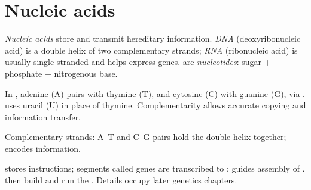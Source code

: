\section{Nucleic acids}

\begin{definition}\label{def:g10:molecules-of-life:nucleic}
\emph{Nucleic acids} store and transmit hereditary
information. \emph{DNA} (deoxyribonucleic acid) is a double
helix of two complementary strands; \emph{RNA} (ribonucleic
acid) is usually single-stranded and helps express genes.  are
\emph{nucleotides}: sugar + phosphate + nitrogenous
base.
\end{definition}

\begin{definition}\label{def:g10:molecules-of-life:base-pair}
In , adenine (A) pairs with thymine (T), and cytosine (C) with
guanine (G), via .  uses uracil (U) in place of thymine.
Complementarity allows accurate copying and information transfer.
\end{definition}

\begin{omfigure}

{\small Complementary strands: A--T and C--G pairs hold the double helix
together;  encodes information.}
\end{omfigure}

\begin{proposition}\label{prop:g10:molecules-of-life:info}
 stores instructions; segments called genes are transcribed to ;
 guides assembly of .  then build and run the .
Details occupy later genetics chapters.
\end{proposition}
\admitted

